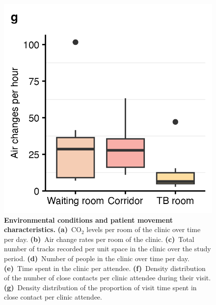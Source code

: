 \documentclass[fleqn,11pt]{wlscirep}
\begin{document}
\begin{figure}
    \includegraphics{results/data/air-changes-per-hour.png}
    \caption{\textbf{Environmental conditions and patient movement characteristics.} \textbf{(a)}~CO$_2$ levels per room of the clinic over time per day. \textbf{(b)}~Air change rates per room of the clinic. \textbf{(c)}~Total number of tracks recorded per unit space in the clinic over the study period. \textbf{(d)}~Number of people in the clinic over time per day. \textbf{(e)}~Time spent in the clinic per attendee. \textbf{(f)}~Density distribution of the number of close contacts per clinic attendee during their visit. \textbf{(g)}~Density distribution of the proportion of visit time spent in close contact per clinic attendee.}
    \label{fig:input-data-descriptives}
\end{figure}
\end{document}

